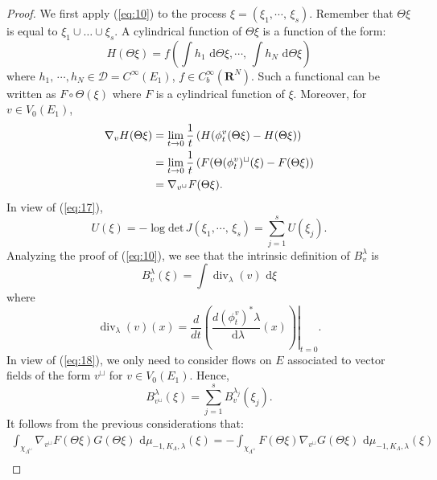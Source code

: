 \documentclass[11pt,a4paper]{amsart}
\begin{document}
\begin{proof}
  We first apply (\ref{eq:10}) to the process $\xi=(\xi_1,\cdots,\,
  \xi_s)$. Remember that $\Theta \xi$ is equal to $
  \xi_1\cup\ldots\cup\xi_s$. A cylindrical function of $\Theta \xi$ is
  a function of the form:
  \begin{equation*}
    H(\Theta \xi)=f(\int h_1{\text{ d}} \Theta \xi,\cdots,\, \int h_N{\text{ d}} \Theta \xi)
  \end{equation*}
  where $h_1,\, \cdots,h_N \in \mathcal{D}=C^{\infty}(E_1)$, $f \in
  C^{\infty}_b({{\mathbf R}}^N)$. Such a functional can be written as
  \begin{math}
    F\circ \Theta(\xi)
  \end{math}
  where $F$ is a cylindrical function of $\xi.$ Moreover, for $v\in
  V_0(E_1)$,
  \begin{align}
    \nabla_v H(\Theta \xi)&=\lim_{t\to
      0}\frac{1}{t}\left(H(\phi_t^v(\Theta \xi )-H(\Theta \xi)\right)\notag\\
    &=\lim_{t\to
      0}\frac{1}{t}\left(F(\Theta(\phi_t^v)^\sqcup(\xi)-F(\Theta\xi)\right)\notag\\
    &=\nabla_{v^\sqcup}F(\Theta \xi).\label{eq:18}
  \end{align}
  In view of (\ref{eq:17}),
  \begin{equation}\label{eq:20}
    U(\xi)=-\log{{\text{det}}}\, J(\xi_1,\cdots,\,\xi_s)=\sum_{j=1}^s U(\xi_j).
  \end{equation}
  Analyzing the proof of (\ref{eq:10}), we see that the intrinsic
  definition of $B^\lambda_v$ is
  \begin{equation*}
    B^\lambda_v(\xi)=\int {\operatorname{div}}_\lambda(v){\text{ d}}\xi
  \end{equation*}
  where
  \begin{equation*}
    {\operatorname{div}}_\lambda(v)(x)=\left.\frac{d}{dt}\left(\frac{d(\phi_t^v) ^*\lambda}{{\text{ d}}\lambda}(x)\right)\right|_{t=0}.  
  \end{equation*}
  In view of (\ref{eq:18}), we only need to consider flows on $E$
  associated to vector fields of the form $v^\sqcup$ for $v\in
  V_0(E_1).$ Hence,
  \begin{equation}\label{eq:19}
    B^\lambda_{v^\sqcup}(\xi)=\sum_{j=1}^s B_v^{\lambda_j}(\xi_j).
  \end{equation}
  It follows from the previous considerations that:
  \begin{multline*}
    \int_{\chi_{\Lambda^\sqcup}} \nabla_{v^\sqcup} F(\Theta\xi) G(\Theta\xi){\text{ d}}\mu_{-1,K_\Lambda,\lambda}(\xi) =-\int_{\chi_{\Lambda^\sqcup}} F(\Theta\xi)\nabla_{v^\sqcup} G(\Theta\xi){\text{ d}}\mu_{-1,K_\Lambda,\lambda}(\xi)\\

\end{multline*}
\end{proof}
\end{document}
